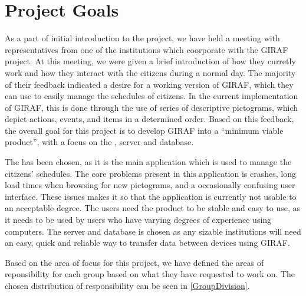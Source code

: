 \section{Project Goals}\label{projectGoals}
As a part of initial introduction to the project, we have held a meeting with
representatives from one of the institutions which coorporate with the GIRAF
project. At this meeting, we were given a brief introduction of how they
curretly work and how they interact with the citizens during a normal day. The
majority of their feedback indicated a desire for a working version of GIRAF,
which they can use to easily manage the schedules of citizens. In the
current implementation of GIRAF, this is done through the use of series of
descriptive pictograms, which depict actions, events, and items in a determined
order. Based on this feedback, the overall goal for this project is to develop
GIRAF into a ``minimum viable product'', with a focus on the
, server and database.\nl

The  has been chosen, as it is the main application which is used
to manage the citizens' schedules. The core problems present in this application
is crashes, long load times when browsing for new pictograms, and a occasionally
confusing user interface. These issues makes it so that the application is
currently not usable to an acceptable degree. The users need the product to be
stable and easy to use, as it needs to be used by users who have varying degrees
of experience using computers. The server and database is chosen as any sizable
institutions will need an easy, quick and reliable way to transfer data between
devices using GIRAF.\nl

Based on the area of focus for this project, we have defined the areas of
reponsibility for each group based on what they have requested to work on. The
chosen distribution of responsibility can be seen in \autoref{GroupDivision}.


